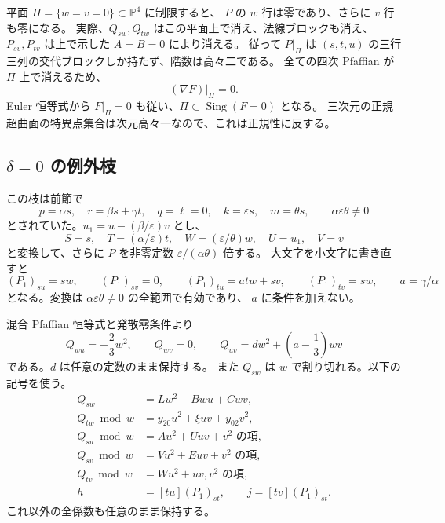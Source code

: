 \documentclass[11pt,a4paper]{ltjsarticle}
\theoremstyle{remark}\newtheorem{remark}[theorem]{注意}
\begin{document}
平面 $\Pi=\{w=v=0\}\subset\mathbb P^4$ に制限すると、
$P$ の $w$ 行は零であり、さらに $v$ 行も零になる。
実際、$Q_{sw},Q_{tw}$ はこの平面上で消え、法線ブロックも消え、
$P_{sv},P_{tv}$ は上で示した $A=B=0$ により消える。
従って $P|_\Pi$ は $(s,t,u)$ の三行三列の交代ブロックしか持たず、階数は高々二である。
全ての四次 Pfaffian が $\Pi$ 上で消えるため、
\[
                              (\nabla F)|_\Pi=0.
\]
Euler 恒等式から $F|_\Pi=0$ も従い、$\Pi\subset\operatorname{Sing}(F=0)$ となる。
三次元の正規超曲面の特異点集合は次元高々一なので、これは正規性に反する。

\subsection{\texorpdfstring{$\delta=0$}{delta=0} の例外枝}

この枝は前節で
\[
 p=\alpha s,\quad r=\beta s+\gamma t,\quad
 q=\ell=0,\quad k=\varepsilon s,\quad m=\theta s,
 \qquad\alpha\varepsilon\theta\ne0
\]
とされていた。$u_1=u-(\beta/\varepsilon)v$ とし、
\[
 S=s,\quad T=(\alpha/\varepsilon)t,\quad
 W=(\varepsilon/\theta)w,\quad U=u_1,\quad V=v
\]
と変換して、さらに $P$ を非零定数 $\varepsilon/(\alpha\theta)$ 倍する。
大文字を小文字に書き直すと
\begin{equation}\label{eq:v19-exceptional-jet}
 (P_1)_{su}=sw,\qquad (P_1)_{sv}=0,\qquad
 (P_1)_{tu}=atw+sv,\qquad (P_1)_{tv}=sw,
 \qquad a=\gamma/\alpha
\end{equation}
となる。変換は $\alpha\varepsilon\theta\ne0$ の全範囲で有効であり、
$a$ に条件を加えない。

混合 Pfaffian 恒等式と発散零条件より
\begin{equation}\label{eq:v19-exceptional-normal}
 Q_{wu}=-\frac23w^2,\qquad Q_{wv}=0,\qquad
 Q_{uv}=dw^2+\left(a-\frac13\right)wv
\end{equation}
である。$d$ は任意の定数のまま保持する。
また $Q_{sw}$ は $w$ で割り切れる。以下の記号を使う。
\begin{align*}
 Q_{sw}&=Lw^2+Bwu+Cwv,\\
 Q_{tw}\bmod w&=y_{20}u^2+\xi uv+y_{02}v^2,\\
 Q_{su}\bmod w&=Au^2+Uuv+\text{$v^2$ の項},\\
 Q_{sv}\bmod w&=Vu^2+Euv+\text{$v^2$ の項},\\
 Q_{tv}\bmod w&=Wu^2+\text{$uv,v^2$ の項},\\
 h&=[tu](P_1)_{st},\qquad j=[tv](P_1)_{st}.
\end{align*}
これ以外の全係数も任意のまま保持する。
\end{document}
